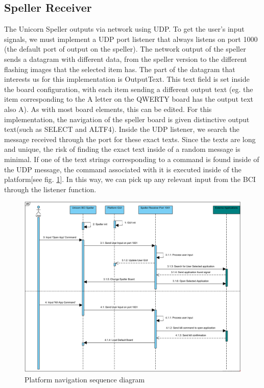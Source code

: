 \subsection{Speller Receiver}\label{subsect:Speller Receiver}
The Unicorn Speller outputs via network using UDP. To get the user's input signals, we must implement a UDP port listener that always listens on port 1000 (the default port of output on the speller). The network output of the speller sends a datagram with different data, from the speller version to the different flashing images that the selected item has. The part of the datagram that interests us for this implementation is OutputText. This text field is set inside the board configuration, with each item sending a different output text (eg. the item corresponding to the A letter on the QWERTY board has the output text also A). As with most board elements, this can be edited. For this implementation, the navigation of the speller board is given distinctive output text(such as SELECT and ALTF4). Inside the UDP listener, we search the message received through the port for these exact texts. Since the texts are long and unique, the risk of finding the exact text inside of a random message is minimal. If one of the text strings corresponding to a command is found inside of the UDP message, the command associated with it is executed inside of the platform[see fig. \ref{fig:platform navigation}]. In this way, we can pick up any relevant input from the BCI through the listener function.

\begin{figure}[H]
  \centering
  \includegraphics[width=1\textwidth]{Diagrams/Sequence/Platform - Nav.png}
  \caption{Platform navigation sequence diagram}
  \label{fig:platform navigation}
\end{figure}


